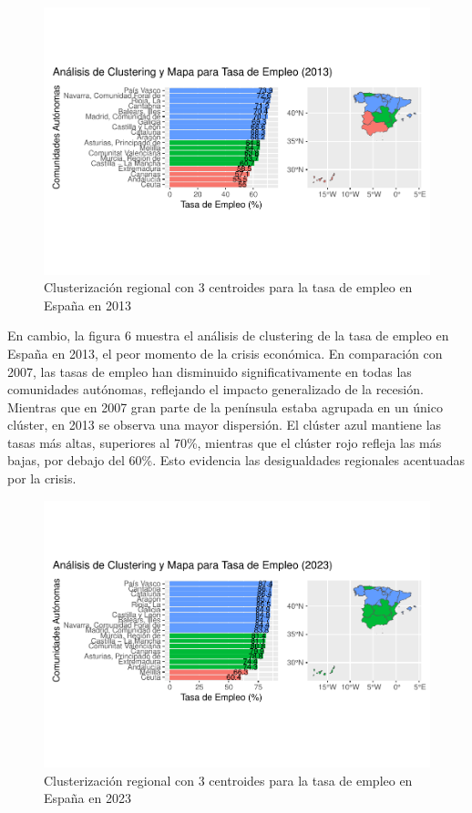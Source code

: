 \documentclass[Universitat de
València,article,submit,moreauthors,pdftex]{Definitions/mdpi}
\begin{document}
\begin{figure}[h]

{\centering \includegraphics[width=0.9\linewidth]{ProyectoAED2024_files/figure-latex/unnamed-chunk-36-1} 

}

\caption{Clusterización regional con 3 centroides para la tasa de empleo en España en 2013}\label{fig:unnamed-chunk-36}
\end{figure}

En cambio, la figura 6 muestra el análisis de clustering de la tasa de
empleo en España en 2013, el peor momento de la crisis económica. En
comparación con 2007, las tasas de empleo han disminuido
significativamente en todas las comunidades autónomas, reflejando el
impacto generalizado de la recesión. Mientras que en 2007 gran parte de
la península estaba agrupada en un único clúster, en 2013 se observa una
mayor dispersión. El clúster azul mantiene las tasas más altas,
superiores al 70\%, mientras que el clúster rojo refleja las más bajas,
por debajo del 60\%. Esto evidencia las desigualdades regionales
acentuadas por la crisis.\newline

\begin{figure}[h]

{\centering \includegraphics[width=0.9\linewidth]{ProyectoAED2024_files/figure-latex/unnamed-chunk-37-1} 

}

\caption{Clusterización regional con 3 centroides para la tasa de empleo en España en 2023}\label{fig:unnamed-chunk-37}
\end{figure}
\end{document}

